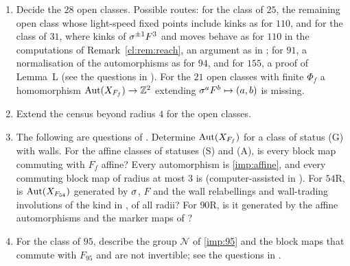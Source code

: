 \begin{enumerate}
\item Decide the $28$ open classes. Possible routes: for the class of $25$, the remaining open class whose light-speed fixed points include kinks as for $110$, and for the class of $31$, where kinks of $\sigma^{\pm1}F^3$ and moves behave as for $110$ in the computations of Remark~\ref{cl:rem:reach}, an argument as in \cite{PaperA}; for $91$, a normalisation of the automorphisms as for $94$, and for $155$, a proof of Lemma~L (see the questions in \cite{PaperE}). For the $21$ open classes with finite $\Phi_f$ a homomorphism $\operatorname{Aut}(X_{F_f})\to\mathbb{Z}^2$ extending $\sigma^aF^b\mapsto(a,b)$ is missing.
\item Extend the census beyond radius $4$ for the open classes.
\item The following are questions of \cite{PaperC}. Determine $\operatorname{Aut}(X_{F_f})$ for a class of status (G) with walls. For the affine classes of statuses (S) and (A), is every block map commuting with $F_f$ affine? Every automorphism is \eqref{imp:affine}, and every commuting block map of radius at most $3$ is (computer-assisted in \cite{PaperC}). For $54$R, is $\operatorname{Aut}(X_{F_{54}})$ generated by $\sigma$, $F$ and the wall relabellings and wall-trading involutions of the kind in \cite{PaperC}, of all radii? For $90$R, is it generated by the affine automorphisms and the marker maps of \cite{PaperC}?
\item For the class of $95$, describe the group $\mathcal N$ of \eqref{imp:95} and the block maps that commute with $F_{95}$ and are not invertible; see the questions in \cite{PaperE}.
\end{enumerate}
